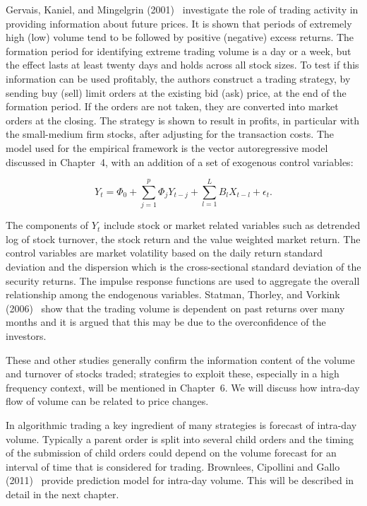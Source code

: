 Gervais, Kaniel, and Mingelgrin (2001)~\cite{gervais2001high} investigate the role of trading activity in providing information about future prices. It is shown that periods of extremely high (low) volume tend to be followed by positive (negative) excess returns. The formation period for identifying extreme trading volume is a day or a week, but the effect lasts at least twenty days and holds across all stock sizes. To test if this information can be used profitably, the authors construct a trading strategy, by sending buy (sell) limit orders at the existing bid (ask) price, at the end of the formation period. If the orders are not taken, they are converted into market orders at the closing. The strategy is shown to result in profits, in particular with the small-medium firm stocks, after adjusting for the transaction costs. The model used for the empirical framework is the vector autoregressive model discussed in Chapter~4, with an addition of a set of exogenous control variables:

	\begin{equation}\label{eqn:2Ytphi}
	Y_t = \Phi_0 + \sum_{j=1}^p \Phi_j Y_{t-j} + \sum_{l=1}^L B_l X_{t-l} + \epsilon_t.
	\end{equation}


The components of $Y_t$ include stock or market related variables such as detrended log of stock turnover, the stock return and the value weighted market return. The control variables are market volatility based on the daily return standard deviation and the dispersion which is the cross-sectional standard deviation of the security returns. The impulse response functions are used to aggregate the overall relationship among the endogenous variables. Statman, Thorley, and Vorkink (2006)~\cite{statman2006investor} show that the trading volume is dependent on past returns over many months and it is argued that this may be due to the overconfidence of the investors.


These and other studies generally confirm the information content of the volume and turnover of stocks traded; strategies to exploit these, especially in a high frequency context, will be mentioned in Chapter~6. We will discuss how intra-day flow of volume can be related to price changes. 


In algorithmic trading a key ingredient of many strategies is forecast of intra-day volume. Typically a parent order is split into several child orders and the timing of the submission of child orders could depend on the volume forecast for an interval of time that is considered for trading. Brownlees, Cipollini and Gallo (2011)~\cite{brownless} provide prediction model for intra-day volume. This will be described in detail in the next chapter.


